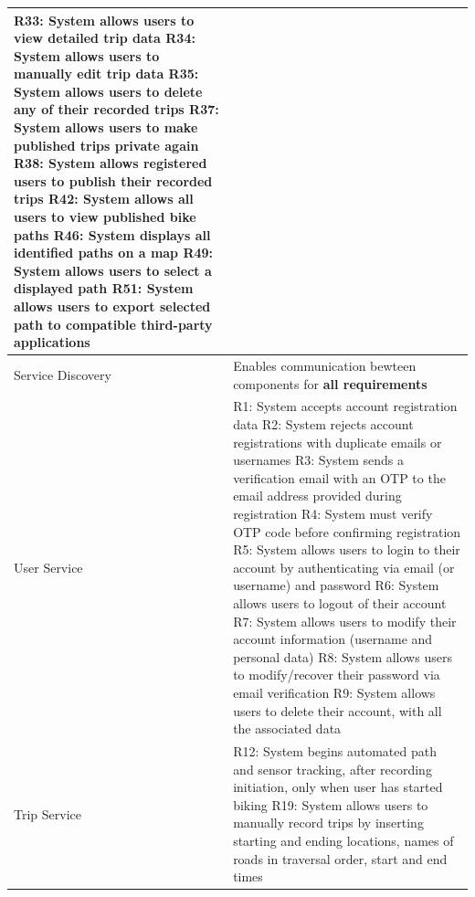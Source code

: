 \begin{longtable}{|p{3cm}|p{13cm}|}
   R33: System allows users to view detailed trip data \newline
   R34: System allows users to manually edit trip data \newline
   R35: System allows users to delete any of their recorded trips \newline
   R37: System allows users to make published trips private again \newline
   R38: System allows registered users to publish their recorded trips \newline
   R42: System allows all users to view published bike paths \newline
   R46: System displays all identified paths on a map \newline
   R49: System allows users to select a displayed path \newline
   R51: System allows users to export selected path to compatible third-party applications \\ \hline
   Service Discovery & 
   Enables communication bewteen components for \textbf{all requirements} \\ \hline
   User Service & 
   R1: System accepts account registration data \newline
   R2: System rejects account registrations with duplicate emails or usernames \newline
   R3: System sends a verification email with an OTP to the email address provided during registration \newline
   R4: System must verify OTP code before confirming registration \newline
   R5: System allows users to login to their account by authenticating via email (or username) and password \newline
   R6: System allows users to logout of their account \newline
   R7: System allows users to modify their account information (username and personal data) \newline
   R8: System allows users to modify/recover their password via email verification \newline
   R9: System allows users to delete their account, with all the associated data \\ \hline
   Trip Service & 
   R12: System begins automated path and sensor tracking, after recording initiation, only when user has started biking \newline
   R19: System allows users to manually record trips by inserting starting and ending locations, names of roads in traversal order, start and end times \newline

\end{longtable}
